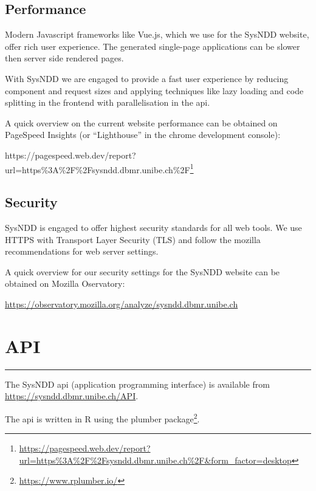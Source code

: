 \documentclass[
]{article}
\renewcommand{\href}[2]{#2\footnote{\url{#1}}}
\begin{document}
\hypertarget{performance}{%
\subsection{Performance}\label{performance}}

Modern Javascript frameworks like Vue.js, which we use for the SysNDD website, offer rich user experience. The generated single-page applications can be slower then server side rendered pages.

With SysNDD we are engaged to provide a fast user experience by reducing component and request sizes and applying techniques like lazy loading and code splitting in the frontend with parallelisation in the api.

A quick overview on the current website performance can be obtained on PageSpeed Insights (or ``Lighthouse'' in the chrome development console):

\href{https://pagespeed.web.dev/report?url=https\%3A\%2F\%2Fsysndd.dbmr.unibe.ch\%2F\&form_factor=desktop}{https://pagespeed.web.dev/report?url=https\%3A\%2F\%2Fsysndd.dbmr.unibe.ch\%2F}

\hypertarget{security}{%
\subsection{Security}\label{security}}

SysNDD is engaged to offer highest security standards for all web tools.
We use HTTPS with Transport Layer Security (TLS) and follow the mozilla recommendations for web server settings.

A quick overview for our security settings for the SysNDD website can be obtained on Mozilla Oservatory:

\url{https://observatory.mozilla.org/analyze/sysndd.dbmr.unibe.ch}

\hypertarget{api}{%
\section{API}\label{api}}

\begin{center}\rule{0.5\linewidth}{0.5pt}\end{center}

The SysNDD api (application programming interface) is available from \url{https://sysndd.dbmr.unibe.ch/API}.

The api is written in R using the \href{https://www.rplumber.io/}{plumber package}.
\end{document}
